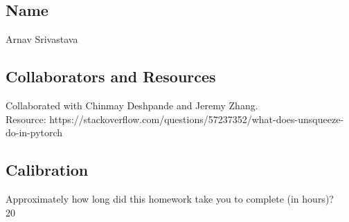 \documentclass[submit]{harvardml}
\begin{document}
\newpage
\subsection*{Name}
Arnav Srivastava

\subsection*{Collaborators and Resources}
Collaborated with Chinmay Deshpande and Jeremy Zhang. \\
Resource: https://stackoverflow.com/questions/57237352/what-does-unsqueeze-do-in-pytorch

\subsection*{Calibration}
Approximately how long did this homework take you to complete (in hours)? \\
20
\end{document}
